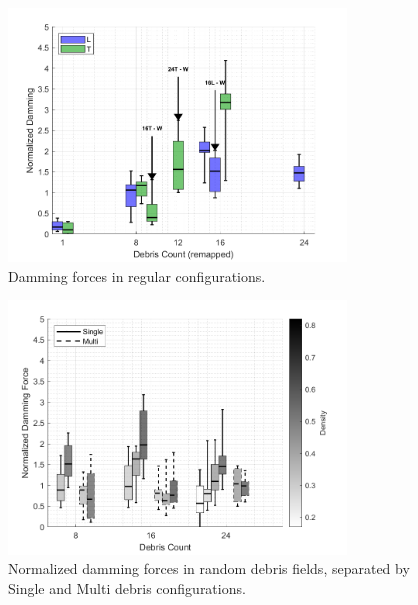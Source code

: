 \documentclass{article}
\begin{document}
\begin{figure}[htbp]
    \centering
    \includegraphics[width=0.8\textwidth]{Damming_Regular_L_T_SplitByTrial_Remapped.png}
    \caption{Damming forces in regular configurations.}
    \label{fig:damming_regular_remap}
\end{figure}
\begin{figure}[htbp]
    \centering
    \includegraphics[width=0.8\textwidth]{Damming_Random_Single_vs_Multi_ByDensityGradient.png}
    \caption{Normalized damming forces in random debris fields, separated by Single and Multi debris configurations.}
    \label{fig:random_damming_gradient}
\end{figure}
\end{document}
